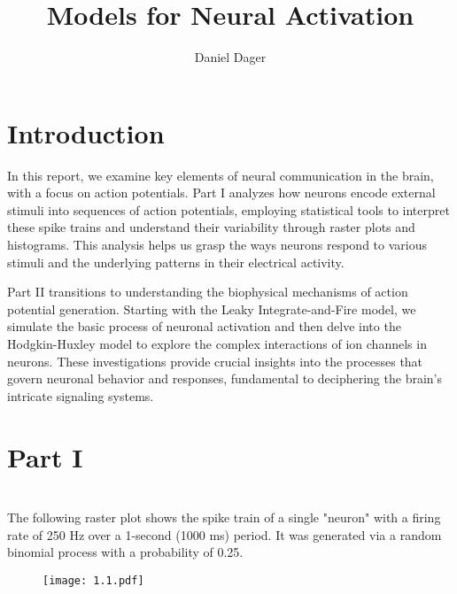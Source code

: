 \documentclass{article}
\makeatletter
\renewcommand{\maketitle}{
    {\raggedleft  %
    \vspace*{-10pt}  %
    {\large\@title \par}  %
    \vspace{5pt}  %
    {\normalsize\@author \par}
    \vspace{5pt}  %
    {\normalsize\@date \par}
    \vspace{20pt}}  %
}
\makeatother
\begin{document}
\title{Models for Neural Activation}
\author{Daniel Dager}
\date{}
\maketitle

\pagestyle{empty} %
\thispagestyle{empty}

\renewcommand{\thesection}{1.\arabic{section}}

\section*{Introduction}
In this report, we examine key elements of neural communication in the brain, with a focus on action potentials. Part I analyzes how neurons encode external stimuli into sequences of action potentials, employing statistical tools to interpret these spike trains and understand their variability through raster plots and histograms. This analysis helps us grasp the ways neurons respond to various stimuli and the underlying patterns in their electrical activity.
\vspace{4pt}

Part II transitions to understanding the biophysical mechanisms of action potential generation. Starting with the Leaky Integrate-and-Fire model, we simulate the basic process of neuronal activation and then delve into the Hodgkin-Huxley model to explore the complex interactions of ion channels in neurons. These investigations provide crucial insights into the processes that govern neuronal behavior and responses, fundamental to deciphering the brain's intricate signaling systems.
\vspace{6px}

\section*{Part I}

\section{}
The following raster plot shows the spike train of a single "neuron" with a firing rate of 250 Hz over a 1-second (1000 ms) period. It was generated via a random binomial process with a probability of 0.25.

\begin{figure}[ht]
    \centering
    \texttt{[image: 1.1.pdf]}
\end{figure}
\end{document}
